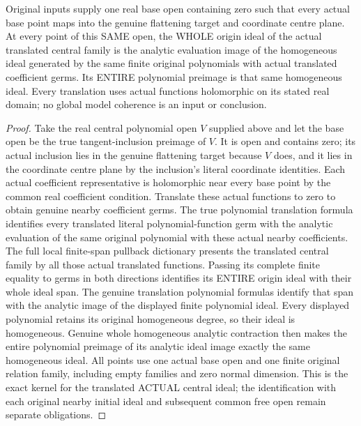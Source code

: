 \begin{theorem}
\label{hir:real-domain-original-all-translated-central-polynomial-kernels}
\leanok
Original inputs supply one real base open containing zero such that every
actual base point maps into the genuine flattening target and coordinate
centre plane. At every point of this SAME open, the WHOLE origin ideal of the
actual translated central family is the analytic evaluation image of the
homogeneous ideal generated by the same finite original polynomials with
actual translated coefficient germs. Its ENTIRE polynomial preimage is that
same homogeneous ideal. Every translation uses actual functions holomorphic
on its stated real domain; no global model coherence is an input or conclusion.
\end{theorem}
\begin{proof}
Take the real central polynomial open $V$ supplied above and let the base open
be the true tangent-inclusion preimage of $V$. It is open and contains zero;
its actual inclusion lies in the genuine flattening target because
$V$ does, and it lies in the coordinate centre plane by the inclusion's
literal coordinate identities. Each actual coefficient representative is
holomorphic near every base point by the common real coefficient condition.
Translate these actual functions to zero to obtain genuine nearby coefficient
germs. The true polynomial translation formula identifies every translated
literal polynomial-function germ with the analytic evaluation of the same
original polynomial with these actual nearby coefficients. The full local
finite-span pullback dictionary presents the translated central family by
all those actual translated functions. Passing its complete finite equality
to germs in both directions identifies its ENTIRE origin ideal with their
whole ideal span. The genuine translation polynomial formulas identify that
span with the analytic image of the displayed finite polynomial ideal.
Every displayed polynomial retains its original homogeneous degree, so their
ideal is homogeneous. Genuine whole homogeneous analytic contraction then
makes the entire polynomial preimage of its analytic ideal image exactly the
same homogeneous ideal. All points use one actual base open and one finite
original relation family, including empty families and zero normal dimension.
This is the exact kernel for the translated ACTUAL central ideal; the
identification with each original nearby initial ideal and subsequent common
free open remain separate obligations.
\end{proof}
